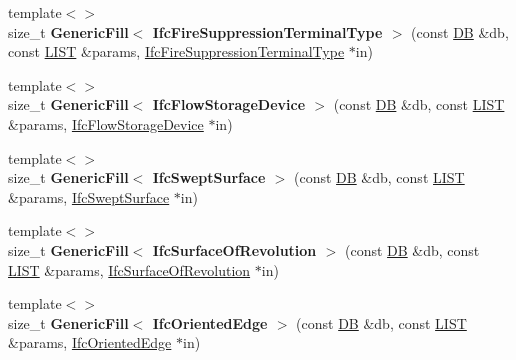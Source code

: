 \begin{DoxyCompactItemize}
\item 
\hypertarget{namespace_assimp_1_1_s_t_e_p_ae9196f89ed0904529674c87fd7812795}{{\footnotesize template$<$$>$ }\\size\+\_\+t {\bfseries Generic\+Fill$<$ Ifc\+Fire\+Suppression\+Terminal\+Type $>$} (const \hyperlink{class_assimp_1_1_s_t_e_p_1_1_d_b}{D\+B} \&db, const \hyperlink{class_assimp_1_1_s_t_e_p_1_1_e_x_p_r_e_s_s_1_1_l_i_s_t}{L\+I\+S\+T} \&params, \hyperlink{struct_assimp_1_1_i_f_c_1_1_ifc_fire_suppression_terminal_type}{Ifc\+Fire\+Suppression\+Terminal\+Type} $\ast$in)}\label{namespace_assimp_1_1_s_t_e_p_ae9196f89ed0904529674c87fd7812795}

\item 
\hypertarget{namespace_assimp_1_1_s_t_e_p_a744aa4a8ac44daa148f1053148d0c2ba}{{\footnotesize template$<$$>$ }\\size\+\_\+t {\bfseries Generic\+Fill$<$ Ifc\+Flow\+Storage\+Device $>$} (const \hyperlink{class_assimp_1_1_s_t_e_p_1_1_d_b}{D\+B} \&db, const \hyperlink{class_assimp_1_1_s_t_e_p_1_1_e_x_p_r_e_s_s_1_1_l_i_s_t}{L\+I\+S\+T} \&params, \hyperlink{struct_assimp_1_1_i_f_c_1_1_ifc_flow_storage_device}{Ifc\+Flow\+Storage\+Device} $\ast$in)}\label{namespace_assimp_1_1_s_t_e_p_a744aa4a8ac44daa148f1053148d0c2ba}

\item 
\hypertarget{namespace_assimp_1_1_s_t_e_p_a55832a3b6faf95adf1634ede082b8f46}{{\footnotesize template$<$$>$ }\\size\+\_\+t {\bfseries Generic\+Fill$<$ Ifc\+Swept\+Surface $>$} (const \hyperlink{class_assimp_1_1_s_t_e_p_1_1_d_b}{D\+B} \&db, const \hyperlink{class_assimp_1_1_s_t_e_p_1_1_e_x_p_r_e_s_s_1_1_l_i_s_t}{L\+I\+S\+T} \&params, \hyperlink{struct_assimp_1_1_i_f_c_1_1_ifc_swept_surface}{Ifc\+Swept\+Surface} $\ast$in)}\label{namespace_assimp_1_1_s_t_e_p_a55832a3b6faf95adf1634ede082b8f46}

\item 
\hypertarget{namespace_assimp_1_1_s_t_e_p_a6c49ca0e654bec501408631ed723f22c}{{\footnotesize template$<$$>$ }\\size\+\_\+t {\bfseries Generic\+Fill$<$ Ifc\+Surface\+Of\+Revolution $>$} (const \hyperlink{class_assimp_1_1_s_t_e_p_1_1_d_b}{D\+B} \&db, const \hyperlink{class_assimp_1_1_s_t_e_p_1_1_e_x_p_r_e_s_s_1_1_l_i_s_t}{L\+I\+S\+T} \&params, \hyperlink{struct_assimp_1_1_i_f_c_1_1_ifc_surface_of_revolution}{Ifc\+Surface\+Of\+Revolution} $\ast$in)}\label{namespace_assimp_1_1_s_t_e_p_a6c49ca0e654bec501408631ed723f22c}

\item 
\hypertarget{namespace_assimp_1_1_s_t_e_p_a5f4edbdb518870fc9b18009a2b0554ee}{{\footnotesize template$<$$>$ }\\size\+\_\+t {\bfseries Generic\+Fill$<$ Ifc\+Oriented\+Edge $>$} (const \hyperlink{class_assimp_1_1_s_t_e_p_1_1_d_b}{D\+B} \&db, const \hyperlink{class_assimp_1_1_s_t_e_p_1_1_e_x_p_r_e_s_s_1_1_l_i_s_t}{L\+I\+S\+T} \&params, \hyperlink{struct_assimp_1_1_i_f_c_1_1_ifc_oriented_edge}{Ifc\+Oriented\+Edge} $\ast$in)}\label{namespace_assimp_1_1_s_t_e_p_a5f4edbdb518870fc9b18009a2b0554ee}


\end{DoxyCompactItemize}
